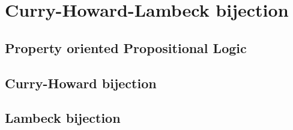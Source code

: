 
\chapter{Curry-Howard-Lambeck bijection}
\section{Property oriented Propositional Logic}
\section{Curry-Howard bijection}
\section{Lambeck bijection}
